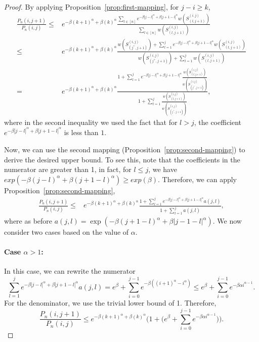 \documentclass{article}
\begin{document}
\begin{proof}
By applying Proposition~\ref{prop:first-mapping}, for $j-i\geq k$,
    \begin{align}\label{eq:wsj-}
        \frac{P_n(i,j+1)}{P_n(i,j)} \leq  
        &e^{-\beta (k+1)^\alpha +\beta(k)^\alpha }\frac{\sum_{l\in [n]} e^{-\beta|j-l|^\alpha + \beta|j+1-l|^\alpha}w(S^{(i,j)}_{(l,j+1)})}
        {\sum_{l\in[n]} w(S^{(i,j)}_{(l,j+1)})} \\\leq &
        e^{-\beta (k+1)^\alpha +\beta(k)^\alpha }\frac{w(S^{(i,j)}_{(j^+,j+1)}) + \sum_{l=1}^j e^{-\beta|j-l|^\alpha + \beta|j+1-l|^\alpha}w(S_{(l,j+1)}^{(i,j)}) }
        { w(S^{(i,j)}_{(j^+,j+1)}) + \sum_{l=1}^j w(S_{(l,j+1)}^{(i,j)})}\\
        = &
        e^{-\beta (k+1)^\alpha +\beta(k)^\alpha }\frac{1+ \sum_{l=1}^j e^{-\beta|j-l|^\alpha + \beta|j+1-l|^\alpha}\frac{w(S_{(l,j+1)}^{(i,j)}) }{w(S^{(i,j)}_{(j^+,j+1)}) }}
        {1+ \sum_{l=1}^j \frac{w(S_{(l,j+1)}^{(i,j)})}{w(S^{(i,j)}_{(j^+,j+1)}) }},
    \end{align}
    where in the second inequality we used the fact that for $l> j$, the coefficient  $e^{-\beta|j-l|^\alpha + \beta|j+1-l|^\alpha}$ is less than $1$.  
    
Now, we can use the second mapping (Proposition~\ref{prop:second-mapping}) to derive the desired upper bound. To see this, note that the coefficients in the numerator are greater than 1, in fact, for $l\leq j$, we have $exp(-\beta(j-l)^\alpha + \beta(j+1-l)^\alpha)\geq exp(\beta)$. Therefore, we can apply Proposition~\ref{prop:second-mapping},
 \begin{align*}
        \frac{P_n(i,j+1)}{P_n(i,j)} \leq &
        e^{-\beta (k+1)^\alpha +\beta(k)^\alpha }\frac{1+ \sum_{l=1}^j e^{-\beta|j-l|^\alpha + \beta|j+1-l|^\alpha}a(j,l)}
        {1+ \sum_{l=1}^j a(j,l)},
    \end{align*}
    where as before $a(j,l)= \exp\left(
        -\beta(j+1-l)^\alpha
        +\beta|j-1-l|^\alpha\right)$.
We now consider two cases based on the value of $\alpha$.

\paragraph{Case $\alpha>1$:}   In this case,
we can rewrite the numerator
\[\sum_{l=1}^j e^{-\beta|j-l|^\alpha + \beta|j+1-l|^\alpha}a(j,l)=e^{\beta}+\sum_{i=0}^{j-1}e^{-\beta((i+1)^{\alpha}-i^{\alpha})}\leq e^{\beta}+\sum_{i=0}^{j-1}e^{-\beta\alpha i^{\alpha-1}}. \]
For the denominator, we use the trivial lower bound of 1.
Therefore,
\[  \frac{P_n(i,j+1)}{P_n(i,j)} \le e^{-\beta (k+1)^\alpha +\beta(k)^\alpha }\Big(1+\big( e^{\beta}+\sum_{i=0}^{j-1}e^{-\beta\alpha i^{\alpha-1}}\big)\Big) .\]


\end{proof}
\end{document}
